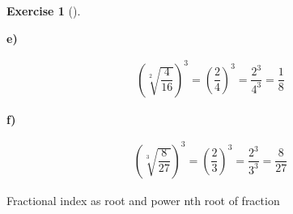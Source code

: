 \documentclass[
  letterpaper,
  DIV=11,
  numbers=noendperiod]{scrreprt}
\theoremstyle{definition}
\newtheorem{exercise}{Exercise}[chapter]
\theoremstyle{remark}
\begin{document}
\begin{exercise}[]
\begin{tcolorbox}
\textbf{e)}

\[
\begin{aligned}
\left(\sqrt[2]{\dfrac{4}{16}}\right)^{3}=\left(\dfrac{2}{4}\right)^{3}=\dfrac{2^{3}}{4^{3}}=\dfrac{1}{8}
\end{aligned}
\]

\textbf{f)}

\[
\begin{aligned}
\left(\sqrt[3]{\dfrac{8}{27}}\right)^{3}=\left(\dfrac{2}{3}\right)^{3}=\dfrac{2^{3}}{3^{3}}=\dfrac{8}{27}
\end{aligned}
\]

\end{tcolorbox}

{Fractional index as root and power} {nth root of fraction}

\end{exercise}
\end{document}
